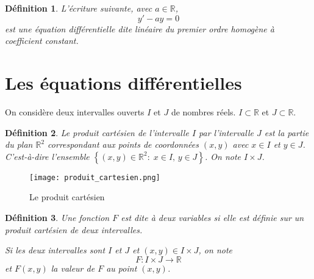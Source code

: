 \documentclass[10pt,a4paper]{article}
\newtheorem{dfn}{Définition}
\begin{document}
\begin{dfn}
L'écriture suivante, avec $a\in\mathbb{R}$,
$$y'-ay=0$$
est une équation différentielle dite linéaire du premier ordre homogène à coefficient constant.
\end{dfn}

\section{Les équations différentielles}


On considère deux intervalles ouverts $I$ et $J$ de nombres réels.
$I\subset \mathbb{R}$ et $J\subset \mathbb{R}$.

\begin{dfn}
Le \textit{produit cartésien} de l'intervalle $I$ par l'intervalle $J$ est la partie du plan
$\mathbb{R}^2$
correspondant aux points de coordonnées $(x,y)$ avec $x\in I$ et $y\in J$.
C'est-à-dire l'ensemble $\left\lbrace (x,y) \in \mathbb{R}^2:\; x\in I,\, y\in J \right\rbrace$.
On note $I\times J$.
\end{dfn}
\begin{figure}[hbtp]
\centering
\texttt{[image: produit\_cartesien.png]}
\caption{Le produit cartésien}
\end{figure}

\begin{dfn}
Une fonction $F$ est dite à deux variables si elle est définie sur un produit cartésien de deux intervalles.

Si les deux intervalles sont $I$ et $J$ et $(x,y)\in I \times J$, on note 
$$F:I\times J \rightarrow \mathbb{R}$$
et $F(x,y)$ la valeur de $F$ au point $(x,y)$.
\end{dfn}
\end{document}
